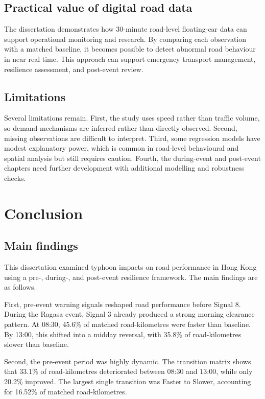 \documentclass[12pt,a4paper]{report}
\begin{document}
\section{Practical value of digital road data}
The dissertation demonstrates how 30-minute road-level floating-car data can support operational monitoring and research. By comparing each observation with a matched baseline, it becomes possible to detect abnormal road behaviour in near real time. This approach can support emergency transport management, resilience assessment, and post-event review.

\section{Limitations}
Several limitations remain. First, the study uses speed rather than traffic volume, so demand mechanisms are inferred rather than directly observed. Second, missing observations are difficult to interpret. Third, some regression models have modest explanatory power, which is common in road-level behavioural and spatial analysis but still requires caution. Fourth, the during-event and post-event chapters need further development with additional modelling and robustness checks.

\chapter{Conclusion}

\section{Main findings}
This dissertation examined typhoon impacts on road performance in Hong Kong using a pre-, during-, and post-event resilience framework. The main findings are as follows.

First, pre-event warning signals reshaped road performance before Signal 8. During the Ragasa event, Signal 3 already produced a strong morning clearance pattern. At 08:30, 45.6\% of matched road-kilometres were faster than baseline. By 13:00, this shifted into a midday reversal, with 35.8\% of road-kilometres slower than baseline.

Second, the pre-event period was highly dynamic. The transition matrix shows that 33.1\% of road-kilometres deteriorated between 08:30 and 13:00, while only 20.2\% improved. The largest single transition was Faster to Slower, accounting for 16.52\% of matched road-kilometres.
\end{document}
